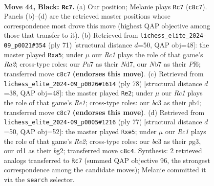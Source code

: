 \documentclass[11pt]{article}
\begin{document}
\clearpage

\begin{figure}[p]\centering
\begin{subfigure}{0.46\textwidth}\centering
\resizebox{\linewidth}{!}{%
\newchessgame
\chessboard[
  setfen={r1r5/pn6/1p2p1kp/5p2/2P4R/N1B1P3/P4PP1/3R1K2 b - - 3 44},
  showmover=false,
  pgfstyle=straightmove, color=movearrow, markmove={c8-c7}
]}
\caption{}
\end{subfigure}\hfill
\begin{subfigure}{0.46\textwidth}\centering
\resizebox{\linewidth}{!}{%
\newchessgame
\chessboard[
  setfen={r7/rp1nk1p1/2p2p2/P5p1/4B1P1/3P3P/4PK2/R1R5 b - - 8 36},
  showmover=false,
  pgfstyle=straightmove, color=movearrow, markmove={a7-a5}
]}
\caption{}
\end{subfigure}
\\[4pt]
\begin{subfigure}{0.46\textwidth}\centering
\resizebox{\linewidth}{!}{%
\newchessgame
\chessboard[
  setfen={4r1k1/2p3p1/8/2P2n1P/pp3N2/4p3/PP1r4/1K2R2R w - - 2 40},
  showmover=false,
  pgfstyle=straightmove, color=movearrow, markmove={e1-e2}
]}
\caption{}
\end{subfigure}\hfill
\begin{subfigure}{0.46\textwidth}\centering
\resizebox{\linewidth}{!}{%
\newchessgame
\chessboard[
  setfen={4r1k1/2p1rpp1/7p/1p2P3/1P6/p1R3P1/6BP/4R2K b - - 0 39},
  showmover=false,
  pgfstyle=straightmove, color=movearrow, markmove={e7-e5}
]}
\caption{}
\end{subfigure}
\caption{\textbf{Move 44, Black: \texttt{Rc7}.} (a) Our position; Melanie plays \texttt{Rc7} (\texttt{c8c7}). Panels (b)--(d) are the retrieved master positions whose correspondence most drove this move (highest QAP objective among those that transfer to it). (b) Retrieved from \texttt{lichess\_elite\_2024-09\_p0021\#354} (ply 71) [structural distance $d$=50, QAP obj=48]: the master played \texttt{Rxa5}; under $\mu$ our \emph{Rc1} plays the role of that game's \emph{Ra2}; cross-type roles: our \emph{P}a7 as their \emph{N}d7, our \emph{N}b7 as their \emph{P}f6; transferred move \texttt{c8c7} \textbf{(endorses this move)}. (c) Retrieved from \texttt{lichess\_elite\_2024-09\_p0026\#1614} (ply 78) [structural distance $d$=38, QAP obj=48]: the master played \texttt{Re2}; under $\mu$ our \emph{Rc1} plays the role of that game's \emph{Re1}; cross-type roles: our \emph{b}c3 as their \emph{p}b4; transferred move \texttt{c8c7} \textbf{(endorses this move)}. (d) Retrieved from \texttt{lichess\_elite\_2024-09\_p0005\#1216} (ply 77) [structural distance $d$=50, QAP obj=52]: the master played \texttt{Rxe5}; under $\mu$ our \emph{Rc1} plays the role of that game's \emph{Re2}; cross-type roles: our \emph{b}c3 as their \emph{p}g3, our \emph{r}d1 as their \emph{b}g2; transferred move \texttt{c8c4}. Synthesis: 2 retrieved analogs transferred to \texttt{Rc7} (summed QAP objective 96, the strongest correspondence among the candidate moves); Melanie committed it via the \texttt{search} selector.}
\label{fig:thought-m87}
\end{figure}
\end{document}
